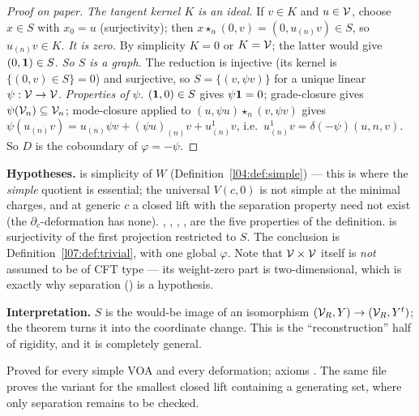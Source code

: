 \begin{proof}[Proof on paper]
\emph{The tangent kernel $K$ is an ideal.} If $v\in K$ and $u\in\mathcal{V}$, choose $x\in S$ with $x_0 = u$
(surjectivity); then $x\star_n(0,v) = (0,u_{(n)}v)\in S$, so $u_{(n)}v\in K$. \emph{It is zero.} By simplicity
$K = 0$ or $K = \mathcal{V}$; the latter would give $(0,\mathbf{1})\in S$. \emph{So $S$ is a graph.} The reduction is
injective (its kernel is $\{(0,v)\in S\} = 0$) and surjective, so $S = \{(v,\psi v)\}$ for a unique linear
$\psi:\mathcal{V}\to\mathcal{V}$. \emph{Properties of $\psi$.} $(\mathbf{1},0)\in S$ gives $\psi\mathbf{1} = 0$; grade-closure gives
$\psi(\mathcal{V}_n)\subseteq\mathcal{V}_n$; mode-closure applied to $(u,\psi u)\star_n(v,\psi v)$ gives
$\psi(u_{(n)}v) = u_{(n)}\psi v + (\psi u)_{(n)}v + u^1_{(n)}v$, i.e.\ $u^1_{(n)}v = \delta(-\psi)(u,n,v)$.
So $D$ is the coboundary of $\varphi = -\psi$.
\end{proof}

\begin{dictionary}
\textbf{Hypotheses.}  is simplicity of $W$ (Definition~\ref{l04:def:simple}) --- this
is where the \emph{simple} quotient is essential; the universal $V(c,0)$ is not simple at the minimal
charges, and at generic $c$ a closed lift with the separation property need not exist (the
$\partial_c$-deformation has none). , , , ,
 are the five properties of the definition.  is
surjectivity of the first projection restricted to $S$. The conclusion  is
Definition~\ref{l07:def:trivial}, with one global $\varphi$. Note that $\mathcal{V}\times\mathcal{V}$ itself is \emph{not}
assumed to be of CFT type --- its weight-zero part is two-dimensional, which is exactly why separation
() is a hypothesis.

\textbf{Interpretation.} $S$ is the would-be image of an isomorphism $(\mathcal{V}_R,Y)\to(\mathcal{V}_R,Y^t)$; the
theorem turns it into the coordinate change. This is the ``reconstruction'' half of rigidity, and it is
completely general.
\end{dictionary}

\begin{status}
Proved for every simple VOA and every deformation; axioms .
The same file proves the variant  for the smallest closed lift
containing a generating set, where only separation remains to be checked.
\end{status}


